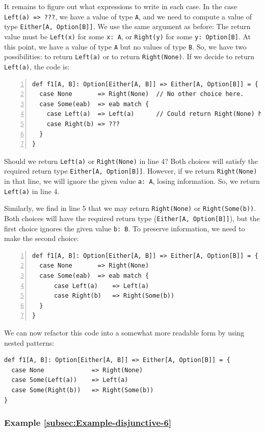 It remains to figure out what expressions to write in each case. In
the case \lstinline!Left(a) => ???!, we have a value of type \lstinline!A!,
and we need to compute a value of type \lstinline!Either[A, Option[B]]!.
We use the same argument as before: The return value must be \lstinline!Left(x)!
for some \lstinline!x: A!, or \lstinline!Right(y)! for some \lstinline!y: Option[B]!.
At this point, we have a value of type \lstinline!A! but no values
of type \lstinline!B!. So, we have two possibilities: to return \lstinline!Left(a)!
or to return \lstinline!Right(None)!. If we decide to return \lstinline!Left(a)!,
the code is:
\begin{lstlisting}[numbers=left]
def f1[A, B]: Option[Either[A, B]] => Either[A, Option[B]] = {
  case None       => Right(None)  // No other choice here.
  case Some(eab)  => eab match {
    case Left(a)  => Left(a)      // Could return Right(None) here.
    case Right(b) => ???
  }
}
\end{lstlisting}
Should we return \lstinline!Left(a)! or \lstinline!Right(None)!
in line 4? Both choices will satisfy the required return type \lstinline!Either[A, Option[B]]!.
However, if we return \lstinline!Right(None)! in that line, we will
ignore the given value \lstinline!a: A!, losing information.
So, we return \lstinline!Left(a)! in line 4.

Similarly, we find in line 5 that we may return \lstinline!Right(None)!
or \lstinline!Right(Some(b))!. Both choices will have the required
return type (\lstinline!Either[A, Option[B]]!), but the first choice
ignores the given value \lstinline!b: B!. To preserve information,
we need to make the second choice:
\begin{lstlisting}[numbers=left]
def f1[A, B]: Option[Either[A, B]] => Either[A, Option[B]] = {
  case None       => Right(None)
  case Some(eab)  => eab match {
      case Left(a)    => Left(a)
      case Right(b)   => Right(Some(b))
  }
}
\end{lstlisting}

We can now refactor this code into a somewhat more readable form by
using nested patterns: 
\begin{lstlisting}
def f1[A, B]: Option[Either[A, B]] => Either[A, Option[B]] = {
  case None             => Right(None)
  case Some(Left(a))    => Left(a)
  case Some(Right(b))   => Right(Some(b))
}
\end{lstlisting}


\subsubsection{Example \label{subsec:Example-disjunctive-6}\ref{subsec:Example-disjunctive-6}}

